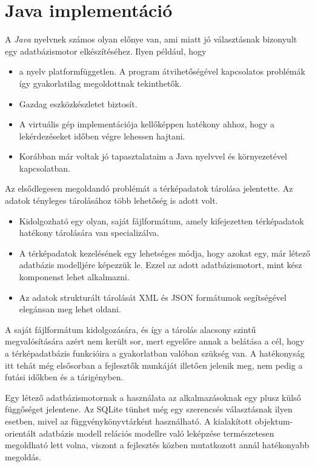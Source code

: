 
\section{Java implementáció}

A \textit{Java} nyelvnek számos olyan előnye van, ami miatt jó választásnak bizonyult egy adatbázismotor elkészítéséhez. Ilyen például, hogy
\begin{itemize}
\item a nyelv platformfüggetlen. A program átvihetőségével kapcsolatos problémák így gyakorlatilag megoldottnak tekinthetők.
\item Gazdag eszközkészletet biztosít.
\item A virtuális gép implementációja kellőképpen hatékony ahhoz, hogy a lekérdezéseket időben végre lehessen hajtani.
\item Korábban már voltak jó tapasztalataim a Java nyelvvel és környezetével kapcsolatban.
\end{itemize}

Az elsődlegesen megoldandó problémát a térképadatok tárolása jelentette. Az adatok tényleges tárolásához több lehetőség is adott volt.
\begin{itemize}
\item Kidolgozható egy olyan, saját fájlformátum, amely kifejezetten térképadatok hatékony tárolására van specializálva.
\item A térképadatok kezelésének egy lehetséges módja, hogy azokat egy, már létező adatbázis modelljére képezzük le. Ezzel az adott adatbázismotort, mint kész komponenst lehet alkalmazni.
\item Az adatok strukturált tárolását XML \cite{XML} és JSON  \cite{JSON} formátumok segítségével elegánsan meg lehet oldani.
\end{itemize}

A saját fájlformátum kidolgozására, és így a tárolás alacsony szintű megvalósítására azért nem került sor, mert egyelőre annak a belátása a cél, hogy a térképadatbázis funkcióira a gyakorlatban valóban szükség van. A hatékonyság itt tehát még elsősorban a fejlesztők munkáját illetően jelenik meg, nem pedig a futási időkben és a tárigényben.

Egy létező adatbázismotornak a használata az alkalmazásoknak egy plusz külső függőséget jelentene. Az SQLite \cite{SQLite} tünhet még egy szerencsés választásnak ilyen esetben, mivel az függvénykönyvtárként használható. A kialakított objektum-orientált adatbázis modell relációs modellre való leképzése természetesen megoldható lett volna, viszont a fejlesztés közben mutatkozott annál hatékonyabb megoldás.

